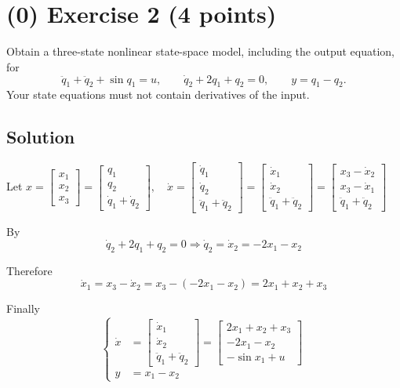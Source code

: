 \documentclass[12pt,a4paper]{article}
\begin{document}
\vspace{3cm}
\vfill
\clearpage
\section*{(0) Exercise 2 \hfill {\normalsize (4 points)}}
Obtain a three-state nonlinear state-space model, including the output equation, for
\[
\ddot q_1+\ddot q_2+\sin q_1=u,\qquad
\dot q_2+2q_1+q_2=0,\qquad y=q_1-q_2.
\]
Your state equations must not contain derivatives of the input.
\subsection*{Solution}

Let $x = \begin{bmatrix}
	x_1 \\ x_2 \\ x_3
\end{bmatrix} = \begin{bmatrix}
q_1 \\ q_2 \\ \dot q_1 + \dot q_2
\end{bmatrix}, \quad \dot x = \begin{bmatrix}
\dot q_1 \\ \dot q_2 \\ \ddot q_1 + \ddot q_2
\end{bmatrix} = \begin{bmatrix}
\dot x_1 \\ \dot x_2 \\ \ddot q_1 + \ddot q_2
\end{bmatrix} = \begin{bmatrix}
x_3 - \dot x_2 \\ x_3 - \dot x_1  \\ \ddot q_1 + \ddot q_2
\end{bmatrix}
$ 

By
\[
\dot q_2 + 2q_1 + q_2 = 0 \Rightarrow \dot q_2 = \dot x_2 = -2x_1 - x_2
\]

Therefore 
\[
\dot x_1 = x_3 - \dot x_2 = x_3 - (-2x_1 - x_2) = 2x_1 + x_2 + x_3
\]

Finally
\[
\begin{cases}
\dot x &= \begin{bmatrix}
	\dot x_1 \\ \dot x_2 \\ \ddot q_1 + \ddot q_2
\end{bmatrix} = \begin{bmatrix}
2x_1 + x_2 + x_3 \\ -2x_1 - x_2 \\ -\sin x_1 + u
\end{bmatrix} \\
y &= x_1 - x_2
\end{cases}
\]
\end{document}
